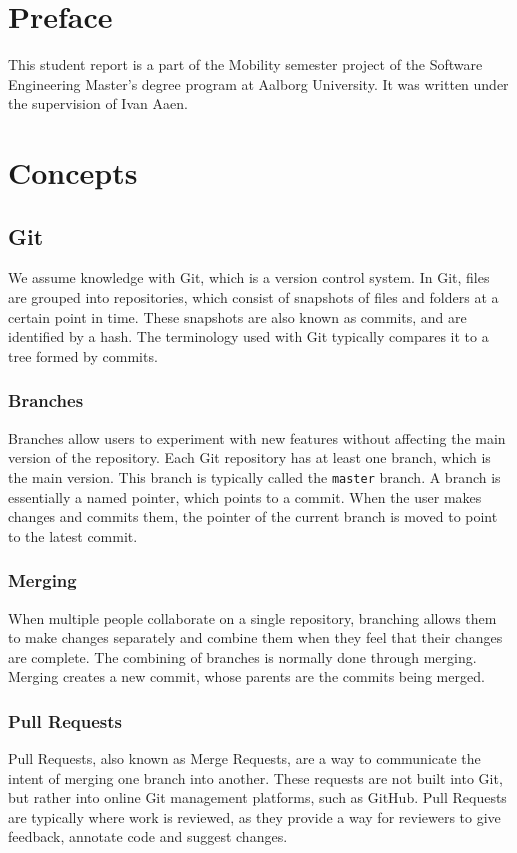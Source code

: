 \chapter*{Preface}
This student report is a part of the Mobility semester project of the Software Engineering Master's degree program at Aalborg University.
It was written under the supervision of Ivan Aaen.

\listoftodos{}

\chapter*{Concepts}

\section*{Git}
We assume knowledge with Git\cite{git}, which is a version control system.
In Git, files are grouped into repositories, which consist of snapshots of files and folders at a certain point in time.
These snapshots are also known as commits, and are identified by a hash.
The terminology used with Git typically compares it to a tree formed by commits.

\subsection*{Branches}
Branches allow users to experiment with new features without affecting the main version of the repository.
Each Git repository has at least one branch, which is the main version.
This branch is typically called the \texttt{master} branch.
A branch is essentially a named pointer, which points to a commit.
When the user makes changes and commits them, the pointer of the current branch is moved to point to the latest commit.

\subsection*{Merging}
When multiple people collaborate on a single repository, branching allows them to make changes separately and combine them when they feel that their changes are complete.
The combining of branches is normally done through merging.
Merging creates a new commit, whose parents are the commits being merged.

\subsection*{Pull Requests}
Pull Requests, also known as Merge Requests, are a way to communicate the intent of merging one branch into another.
These requests are not built into Git, but rather into online Git management platforms, such as GitHub.
Pull Requests are typically where work is reviewed, as they provide a way for reviewers to give feedback, annotate code and suggest changes.


